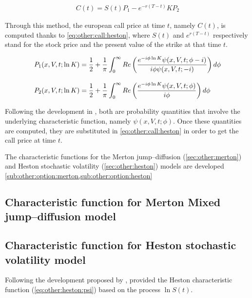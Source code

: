 \documentclass[12pt]{report}
\begin{document}
\begin{align}
  C(t) = S(t) P_1 - e^{-r(T-t)} K P_2 \label{eq:other:call:heston}
\end{align}

Through this method, the european call price at time $t$, namely $C(t)$, is computed thanks to \cref{eq:other:call:heston}, where $S(t)$ and $e^{r(T - t)}$ respectively stand for the stock price and the present value of the strike at that time $t$.

\begin{align}
  P_1(x,V,t;\ln{K}) &= \frac{1}{2} + \frac{1}{\pi} \int_0^{\infty} Re \left( \frac{e^{-i\phi\ln{K}} \psi(x,V,t;\phi - i)}{i\phi\psi(x,V,t;-i)} \right) d\phi \label{eq:other:call:heston:pi1} \\ 
  \intertext{}
  P_2(x,V,t;\ln{K}) &= \frac{1}{2} + \frac{1}{\pi} \int_0^{\infty} Re \left( \frac{e^{-i\phi\ln{K}} \psi(x,V,t;\phi)}{i\phi} \right) d\phi \label{eq:other:call:heston:pi2}
\end{align}

Following the development in \citet{criso2015},  both are probability quantities that involve the underlying characteristic function, namely $\psi(x,V,t;\phi)$. Once these quantities are computed, they are substituted in \cref{eq:other:call:heston} in order to get the call price at time $t$.

The characteristic functions for the Merton jump--diffusion (\cref{sec:other:merton}) and Heston stochastic volatility (\cref{sec:other:heston}) models are developed \cref{sub:other:option:merton,sub:other:option:heston}

\subsection{Characteristic function for Merton Mixed jump--diffusion model}
\label{sub:other:option:merton}

\subsection{Characteristic function for Heston stochastic volatility model}
\label{sub:other:option:heston}

Following the development proposed by \citet{gatheral2006}, \citet{criso2015} provided the Heston characteristic function (\cref{eq:other:heston:psi}) based on the process $\ln S(t)$.
\end{document}
